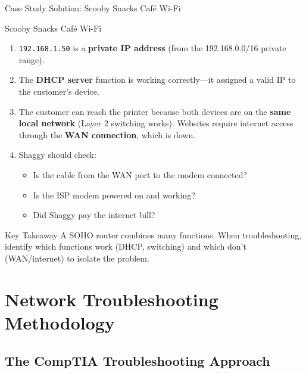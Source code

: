 \documentclass[aspectratio=169]{beamer}  %
\begin{document}
\begin{frame}{Case Study Solution: Scooby Snacks Café Wi-Fi}
    \begin{casesolution}{Scooby Snacks Café Wi-Fi}
        \begin{enumerate}
            \item \texttt{192.168.1.50} is a \textbf{private IP address} (from the 192.168.0.0/16 private range).
            \item The \textbf{DHCP server} function is working correctly---it assigned a valid IP to the customer's device.
            \item The customer can reach the printer because both devices are on the \textbf{same local network} (Layer 2 switching works). Websites require internet access through the \textbf{WAN connection}, which is down.
            \item Shaggy should check:
                \begin{itemize}
                    \item Is the cable from the WAN port to the modem connected?
                    \item Is the ISP modem powered on and working?
                    \item Did Shaggy pay the internet bill?
                \end{itemize}
        \end{enumerate}
    \end{casesolution}
    
    \begin{alertblock}{Key Takeaway}
        \scriptsize
        A SOHO router combines many functions. When troubleshooting, identify which functions work (DHCP, switching) and which don't (WAN/internet) to isolate the problem.
    \end{alertblock}
\end{frame}

\section{Network Troubleshooting Methodology}
\subsection{The CompTIA Troubleshooting Approach}
\end{document}
